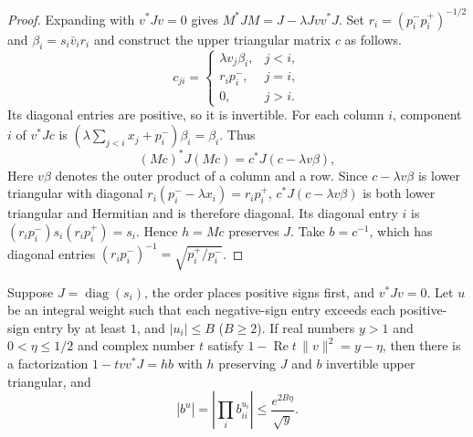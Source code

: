 \begin{proof}
Expanding with $v^*Jv=0$ gives $M^*JM=J-\lambda J v v^*J$. Set $r_i=(p_i^-p_i^+)^{-1/2}$ and $\beta_i=s_i\bar v_i r_i$ and construct the upper triangular matrix $c$ as follows.
\[
 c_{ji}=
 \begin{cases}
        \lambda v_j\beta_i,&j<i,\\
        r_i p_i^-,&j=i,\\
        0,&j>i.
 \end{cases}
\]
Its diagonal entries are positive, so it is invertible. For each column $i$, component $i$ of $v^*Jc$ is $(\lambda\sum_{j<i}x_j+p_i^-)\beta_i=\beta_i$. Thus
\[
       (Mc)^*J(Mc)=c^*J(c-\lambda v\beta),
\]
Here $v\beta$ denotes the outer product of a column and a row. Since $c-\lambda v\beta$ is lower triangular with diagonal $r_i(p_i^--\lambda x_i)=r_i p_i^+$, $c^*J(c-\lambda v\beta)$ is both lower triangular and Hermitian and is therefore diagonal. Its diagonal entry $i$ is $(r_i p_i^-)s_i(r_i p_i^+)=s_i$. Hence $h=Mc$ preserves $J$. Take $b=c^{-1}$, which has diagonal entries $(r_i p_i^-)^{-1}=\sqrt{p_i^+/p_i^-}$.
\end{proof}

\begin{lemma}
\label{lem:c-peak-triangular-weight}
\emitthmsource
Suppose $J=\operatorname{diag}(s_i)$, the order places positive signs first, and $v^*Jv=0$. Let $u$ be an integral weight such that each negative-sign entry exceeds each positive-sign entry by at least $1$, and $|u_i|\le B$ ($B\ge2$). If real numbers $y>1$ and $0<\eta\le1/2$ and complex number $t$ satisfy $1-\operatorname{Re}t\,\|v\|^2=y-\eta$, then there is a factorization $1-tv v^*J=hb$ with $h$ preserving $J$ and $b$ invertible upper triangular, and
\[
           |b^u|=\left|\prod_i b_{ii}^{u_i}\right|
                      \le \frac{e^{2B\eta}}{\sqrt y}.
\]
\end{lemma}

